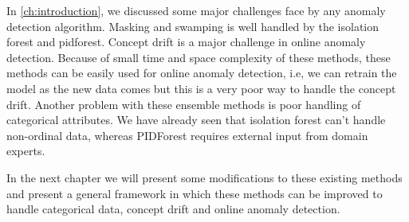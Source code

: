 In \cref{ch:introduction}, we discussed some major challenges face by any anomaly detection algorithm.
Masking and swamping is well handled by the isolation forest and pidforest. 
Concept drift is a major challenge in online anomaly detection. 
Because of small time and space complexity of these methods, these methods can be easily used for online anomaly detection, i.e, we can retrain the model as the new data comes but this is a very poor way to handle the concept drift.
Another problem with these ensemble methods is poor handling of categorical attributes.
We have already seen that isolation forest can't handle non-ordinal data, whereas PIDForest requires external input from domain experts.

In the next chapter we will present some modifications to these existing methods and present a general framework in which these methods can be improved to handle categorical data, concept drift and online anomaly detection.